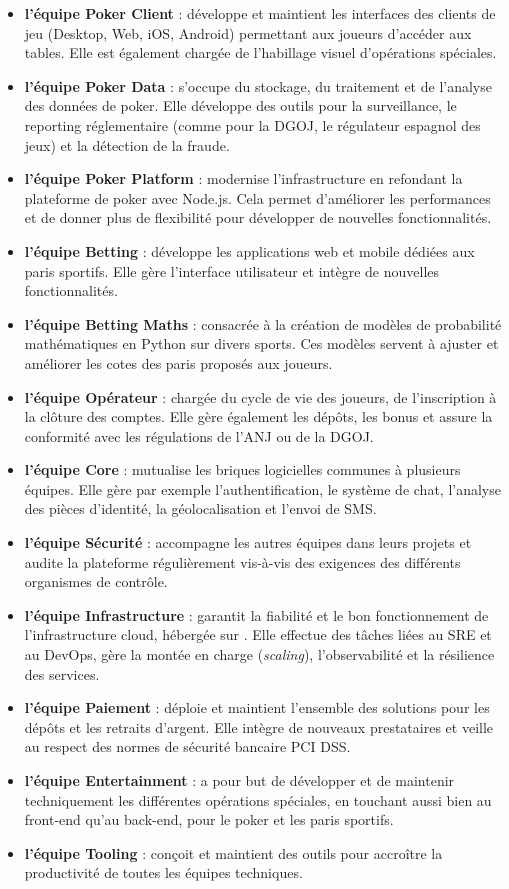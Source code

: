 \begin{itemize}
	\item \textbf{l’équipe Poker Client} : développe et maintient les interfaces des clients de jeu (Desktop, Web, iOS, Android) permettant aux joueurs d’accéder aux tables. Elle est également chargée de l’habillage visuel d’opérations spéciales.
	\item \textbf{l’équipe Poker Data} : s’occupe du stockage, du traitement et de l’analyse des données de poker. Elle développe des outils pour la surveillance, le reporting réglementaire (comme pour la DGOJ, le régulateur espagnol des jeux) et la détection de la fraude.
	\item \textbf{l’équipe Poker Platform} : modernise l’infrastructure en refondant la plateforme de poker avec Node.js. Cela permet d’améliorer les performances et de donner plus de flexibilité pour développer de nouvelles fonctionnalités.
	\item \textbf{l’équipe Betting} : développe les applications web et mobile dédiées aux paris sportifs. Elle gère l’interface utilisateur et intègre de nouvelles fonctionnalités.
	\item \textbf{l’équipe Betting Maths} : consacrée à la création de modèles de probabilité mathématiques en Python sur divers sports. Ces modèles servent à ajuster et améliorer les cotes des paris proposés aux joueurs.
	\item \textbf{l’équipe Opérateur} : chargée du cycle de vie des joueurs, de l’inscription à la clôture des comptes. Elle gère également les dépôts, les bonus et assure la conformité avec les régulations de l’ANJ ou de la DGOJ.
	\item \textbf{l’équipe Core} : mutualise les briques logicielles communes à plusieurs équipes. Elle gère par exemple l’authentification, le système de chat, l’analyse des pièces d’identité, la géolocalisation et l’envoi de SMS.
	\item \textbf{l’équipe Sécurité} : accompagne les autres équipes dans leurs projets et audite la plateforme régulièrement vis-à-vis des exigences des différents organismes de contrôle.
	\item \textbf{l’équipe Infrastructure} : garantit la fiabilité et le bon fonctionnement de l’infrastructure cloud, hébergée sur . Elle effectue des tâches liées au SRE et au DevOps, gère la montée en charge (\emph{scaling}), l’observabilité et la résilience des services.
	\item \textbf{l’équipe Paiement} : déploie et maintient l’ensemble des solutions pour les dépôts et les retraits d’argent. Elle intègre de nouveaux prestataires et veille au respect des normes de sécurité bancaire PCI DSS.
	\item \textbf{l’équipe Entertainment} : a pour but de développer et de maintenir techniquement les différentes opérations spéciales, en touchant aussi bien au front-end qu’au back-end, pour le poker et les paris sportifs.
	\item \textbf{l’équipe Tooling} : conçoit et maintient des outils pour accroître la productivité de toutes les équipes techniques.
\end{itemize}


